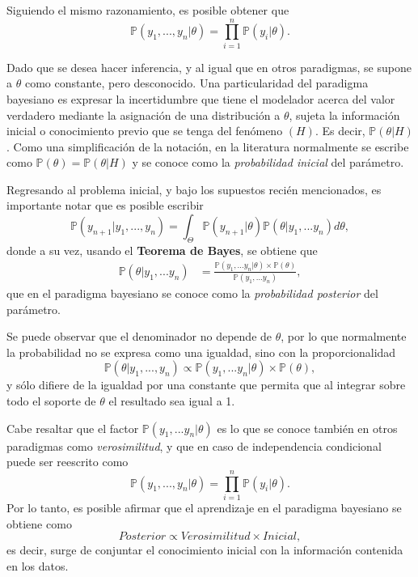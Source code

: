 Siguiendo el mismo razonamiento, es posible obtener que
\begin{equation*}
    \mathbb{P}(y_1,...,y_n | \theta) = \prod_{i=1}^n \mathbb{P}(y_i|\theta). 
\end{equation*}

Dado que se desea hacer inferencia, y al igual que en otros paradigmas, se supone a $\theta$ como constante, pero desconocido. Una particularidad del paradigma bayesiano es expresar la incertidumbre que tiene el modelador acerca del valor verdadero mediante la asignaci\'on de una distribuci\'on a $\theta$, sujeta la informaci\'on inicial o conocimiento previo que se tenga del fen\'omeno $(H)$. Es decir, $\mathbb{P}(\theta|H)$. Como una simplificaci\'on de la notaci\'on, en la literatura normalmente se escribe como $\mathbb{P}(\theta) = \mathbb{P}(\theta|H)$ y se conoce como la \textit{probabilidad inicial} del par\'ametro.

Regresando al problema inicial, y bajo los supuestos reci\'en mencionados, es importante notar que es posible escribir
\begin{equation*}
    \mathbb{P}(y_{n+1} | y_1,...,y_n) =
    \int_{\Theta} 
    \mathbb{P}(y_{n+1}|\theta) \mathbb{P}(\theta|y_1,...y_n)d\theta,
\end{equation*}
donde a su vez, usando el \textbf{Teorema de Bayes}, se obtiene que
\begin{equation*}
\begin{aligned}
    \mathbb{P}(\theta|y_1,...y_n) &=
    \frac{\mathbb{P}(y_1,...y_n|\theta)\times\mathbb{P}(\theta)}
    {\mathbb{P}(y_1,...y_n)},
\end{aligned}
\end{equation*}
que en el paradigma bayesiano se conoce como la \textit{probabilidad posterior} del par\'ametro. 

Se puede observar que el denominador no depende de $\theta$, por lo que normalmente la probabilidad no se expresa como una igualdad, sino con la proporcionalidad
\begin{equation*}
    \mathbb{P}(\theta|y_1,...,y_n) 
    \propto 
    \mathbb{P}(y_1,...y_n|\theta) \times \mathbb{P}(\theta),
\end{equation*}
y s\'olo difiere de la igualdad por una constante que permita que al integrar sobre todo el soporte de $\theta$ el resultado sea igual a 1.

Cabe resaltar que el factor $\mathbb{P}(y_1,...y_n|\theta)$ es lo que se conoce tambi\'en en otros paradigmas como \textit{verosimilitud}, y que en caso de independencia condicional puede ser reescrito como
\begin{equation*}
    \mathbb{P}(y_1,...,y_n|\theta)  = \prod_{i=1}^n \mathbb{P}(y_i|\theta).
\end{equation*}
Por lo tanto, es posible afirmar que el aprendizaje en el paradigma bayesiano se obtiene como
\begin{equation*}
    Posterior \propto Verosimilitud \times Inicial,
\end{equation*}
es decir, surge de conjuntar el conocimiento inicial con la informaci\'on contenida en los datos.

